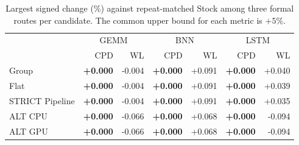 \begin{table}[t]\centering\footnotesize\setlength{\tabcolsep}{2pt}
\caption{Largest signed change (\%) against repeat-matched Stock among three formal routes per candidate. The common upper bound for each metric is $+5\%$.}\label{tab:qor}
\begin{tabular}{lrrrrrr}\toprule
 & \multicolumn{2}{c}{GEMM} & \multicolumn{2}{c}{BNN} & \multicolumn{2}{c}{LSTM}\\
 & CPD & WL & CPD & WL & CPD & WL\\\midrule
Group & \textbf{+0.000} & -0.004 & \textbf{+0.000} & +0.091 & \textbf{+0.000} & +0.040\\
Flat & \textbf{+0.000} & -0.004 & \textbf{+0.000} & +0.091 & \textbf{+0.000} & +0.039\\
STRICT Pipeline & \textbf{+0.000} & -0.004 & \textbf{+0.000} & +0.091 & \textbf{+0.000} & +0.035\\
ALT CPU & \textbf{+0.000} & -0.066 & \textbf{+0.000} & +0.068 & \textbf{+0.000} & -0.094\\
ALT GPU & \textbf{+0.000} & -0.066 & \textbf{+0.000} & +0.068 & \textbf{+0.000} & -0.094\\
\bottomrule\end{tabular}\end{table}
